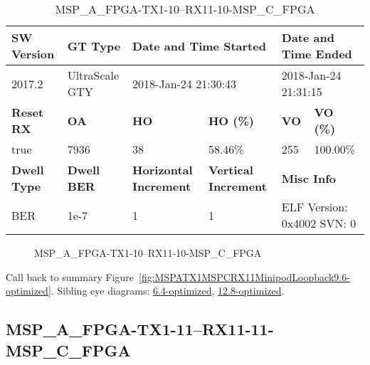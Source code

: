 \begin{table}[h]
\centering
\caption{MSP\_A\_FPGA-TX1-10--RX11-10-MSP\_C\_FPGA}
\label{tab:MSPAFPGATX110RX1110MSPCFPGA9.6-optimized}
\begin{tabular}{@{}|l|l|l|l|l|l|@{}}
\toprule
\textbf{SW Version}                & \textbf{GT Type}   & \multicolumn{2}{l|}{\textbf{Date and Time Started}}            & \multicolumn{2}{l|}{\textbf{Date and Time Ended}}        \\ \midrule
2017.2                       & UltraScale GTY          & \multicolumn{2}{l|}{2018-Jan-24 21:30:43}                   & \multicolumn{2}{l|}{2018-Jan-24 21:31:15}               \\ \midrule
\textbf{Reset RX}                  & \textbf{OA} & \textbf{HO}   & \textbf{HO (\%)} & \textbf{VO} & \textbf{VO (\%)} \\ \midrule
true & 7936        & 38          & 58.46\%        & 255        & 100.00\%       \\ \midrule
\textbf{Dwell Type}                & \textbf{Dwell BER} & \textbf{Horizontal Increment} & \textbf{Vertical Increment}    & \multicolumn{2}{l|}{\textbf{Misc Info}}                  \\ \midrule
BER                            & 1e-7        & 1        & 1           & \multicolumn{2}{l|}{ELF Version: 0x4002 SVN: 0}                         \\ \bottomrule
\end{tabular}
\end{table}

\begin{figure}[h]
\caption{MSP\_A\_FPGA-TX1-10--RX11-10-MSP\_C\_FPGA} \label{fig:MSPAFPGATX110RX1110MSPCFPGA9.6-optimized}
\end{figure}

Call back to summary Figure~\ref{fig:MSPATX1MSPCRX11MinipodLoopback9.6-optimized}.
Sibling eye diagrams: \hyperref[sec:MSPAFPGATX110RX1110MSPCFPGA6.4-optimized]{6.4-optimized}, \hyperref[sec:MSPAFPGATX110RX1110MSPCFPGA12.8-optimized]{12.8-optimized}.

\clearpage
\newpage


\subsection{MSP\_A\_FPGA-TX1-11--RX11-11-MSP\_C\_FPGA}\label{sec:MSPAFPGATX111RX1111MSPCFPGA9.6-optimized}

